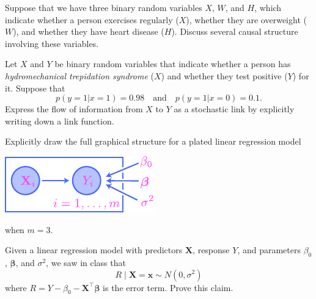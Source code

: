 \documentclass[12pt,reqno]{amsart}
\begin{document}
\bigskip

\prob Suppose that we have three binary random variables $X$, $W$, and $H$, which indicate whether a person exercises regularly ($X$), whether they are overweight ($W$), and whether they have heart disease ($H$). Discuss several causal structure involving these variables.













\vfill
\prob Let $X$ and $Y$ be binary random variables that indicate whether a person has \textit{hydromechanical trepidation syndrome} ($X$) and whether they test positive ($Y$) for it. Suppose that
	\[p(y=1 |x=1) = 0.98 \quad \text{and} \quad p(y=1 | x=0) = 0.1.
	\]
Express the flow of information from $X$ to $Y$ as a stochastic link by explicitly writing down a link function.


	






\vfill
\newpage
\prob Explicitly draw the full graphical structure for a plated linear regression model

\bigskip
\begin{center}
\includegraphics[scale=1.5]{lin-reg-00-plated.pdf}
\end{center}
\bigskip

when $m=3$.














\vfill
\prob Given a linear regression model with predictors $\mathbf{X}$, response $Y$, and parameters $\beta_0$, $\boldsymbol{\beta}$, and $\sigma^2$, we saw in class that
	\[ R \mid \mathbf{X} = \mathbf{x} \sim N(0, \sigma^2)
	\]
where $R = Y - \beta_0 - \mathbf{X}^\intercal \boldsymbol{\beta}$ is the error term. Prove this claim.
\end{document}
